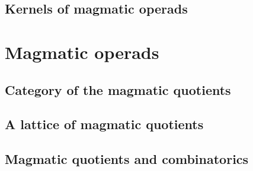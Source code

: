 \subsection{Kernels of magmatic operads}

\section{Magmatic operads}

\subsection{Category of the magmatic quotients}

\subsection{A lattice of magmatic quotients}

\subsection{Magmatic quotients and combinatorics}


